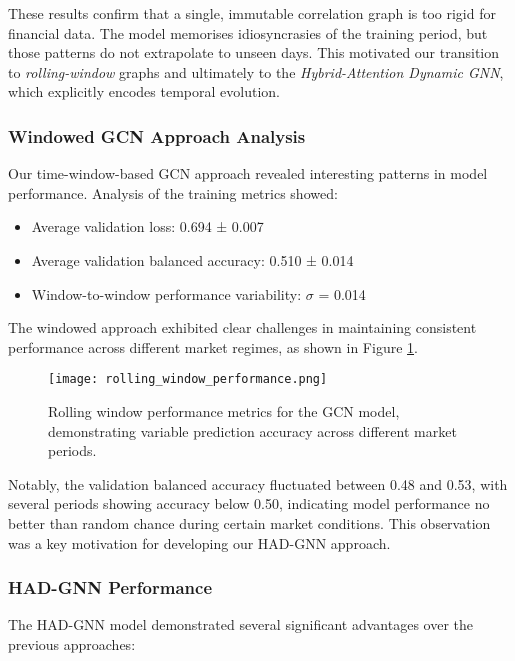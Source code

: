 \documentclass[12pt]{article}
\begin{document}
\medskip
\noindent These results confirm that a single, immutable correlation graph is too rigid for financial data.  
The model memorises idiosyncrasies of the training period, but those patterns do not extrapolate to unseen days.  
This motivated our transition to \emph{rolling-window} graphs and ultimately to the \textit{Hybrid-Attention Dynamic GNN}, which explicitly encodes temporal evolution.

\subsubsection{Windowed GCN Approach Analysis}

Our time-window-based GCN approach revealed interesting patterns in model performance. Analysis of the training metrics showed:

\begin{itemize}
    \item Average validation loss: 0.694 ± 0.007
    \item Average validation balanced accuracy: 0.510 ± 0.014
    \item Window-to-window performance variability: $\sigma$ = 0.014
\end{itemize}

The windowed approach exhibited clear challenges in maintaining consistent performance across different market regimes, as shown in Figure \ref{fig:rolling_performance}.

\begin{figure}[h]
    \centering
    \texttt{[image: rolling\_window\_performance.png]}
    \caption{Rolling window performance metrics for the GCN model, demonstrating variable prediction accuracy across different market periods.}
    \label{fig:rolling_performance}
\end{figure}

Notably, the validation balanced accuracy fluctuated between 0.48 and 0.53, with several periods showing accuracy below 0.50, indicating model performance no better than random chance during certain market conditions. This observation was a key motivation for developing our HAD-GNN approach.

\subsubsection{HAD-GNN Performance}

The HAD-GNN model demonstrated several significant advantages over the previous approaches:
\end{document}
